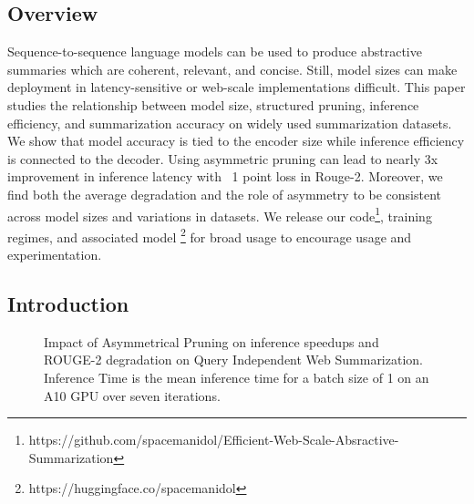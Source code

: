 \subsection{Overview}
Sequence-to-sequence language models can be used to produce abstractive summaries which are coherent, relevant, and concise. Still, model sizes can make deployment in latency-sensitive or web-scale implementations difficult. This paper studies the relationship between model size, structured pruning, inference efficiency, and summarization accuracy on widely used summarization datasets. We show that model accuracy is tied to the encoder size while inference efficiency is connected to the decoder. Using asymmetric pruning can lead to nearly 3x improvement in inference latency with ~1 point loss in Rouge-2. Moreover, we find both the average degradation and the role of asymmetry to be consistent across model sizes and variations in datasets.  We release our code\footnote{https://github.com/spacemanidol/Efficient-Web-Scale-Absractive-Summarization}, training regimes, and associated model \footnote{https://huggingface.co/spacemanidol} for broad usage to encourage usage and experimentation. 
\subsection{Introduction}

\begin{figure}[!htb]
    \centering
    \caption{Impact of Asymmetrical Pruning on inference speedups and ROUGE-2 degradation on Query Independent Web Summarization. Inference Time is the mean inference time for a batch size of 1 on an A10 GPU over seven iterations.   }
    \label{fig:speed}
\end{figure}

